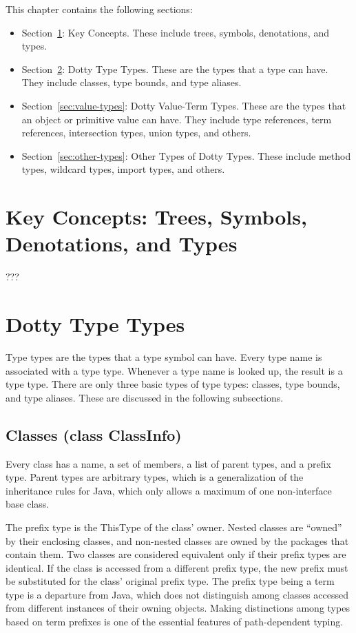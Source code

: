 \documentclass[11pt]{report}
\begin{document}
This chapter contains the following sections:
\begin{itemize}
\item Section~\ref{sec:dotty-key-concepts}: Key Concepts. These include trees, symbols, denotations, and types.
\item Section~\ref{sec:type-types}: Dotty Type Types. These are the types that a type can have. They include classes, type bounds, and type aliases.
\item Section~\ref{sec:value-types}: Dotty Value-Term Types. These are the types that an object or primitive value can have. They include type references, term references, intersection types, union types, and others.
\item Section~\ref{sec:other-types}: Other Types of Dotty Types. These include method types, wildcard types, import types, and others.
\end{itemize}

\section{Key Concepts: Trees, Symbols, Denotations, and Types} \label{sec:dotty-key-concepts}

???

\section{Dotty Type Types} \label{sec:type-types}

Type types are the types that a type symbol can have. Every type name is associated with a type type. Whenever a type name is looked up, the result is a type type.
There are only three basic types of type types: classes, type bounds, and type aliases.
These are discussed in the following subsections.

\subsection{Classes (class ClassInfo)}

Every class has a name, a set of members, a list of parent types, and a prefix type. Parent types are arbitrary types, which is a generalization of the inheritance rules for Java, which only allows a maximum of one non-interface base class.

The prefix type is the ThisType of the class' owner. Nested classes are ``owned'' by their enclosing classes, and non-nested classes are owned by the packages that contain them. Two classes are considered equivalent only if their prefix types are identical. If the class is accessed from a different prefix type, the new prefix must be substituted for the class' original prefix type. The prefix type being a term type is a departure from Java, which does not distinguish among classes accessed from different instances of their owning objects. Making distinctions among types based on term prefixes is one of the essential features of path-dependent typing.
\end{document}
